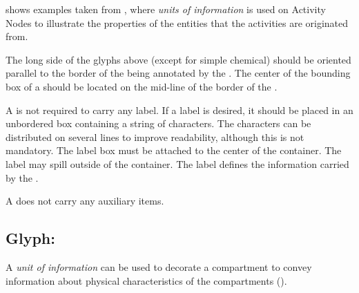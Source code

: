 \begin{glyphDescription}
 shows examples taken from , where \emph{units of information} is used on Activity Nodes to illustrate the properties of the entities that the activities are originated from.

The long side of the glyphs above (except for simple chemical) should be oriented parallel to the border of the  being annotated by the . The center of the bounding box of a  should be located on the mid-line of the border of the .

\glyphLabel A  is not required to carry any label.   If a label is desired, it should be placed in an unbordered box containing a string of characters. The characters can be distributed on several lines to improve readability, although this is not mandatory.  The label box must be attached to the center of the container. The label may spill outside of the container.  The label defines the information carried by the .

\glyphAux A  does not carry any auxiliary items.

\end{glyphDescription}

\subsection{Glyph: }
\label{sec:af:unitInfoComp}

A \emph{unit of information} can be used to decorate a compartment to convey information about physical characteristics of the compartments (). 

